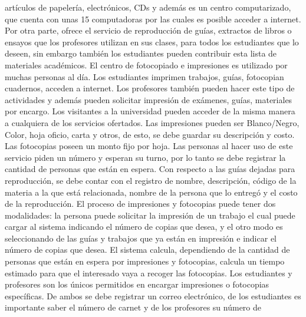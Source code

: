 \message{ !name(InformeFase2.tex)}\documentclass[12pt,a4paper,spanish]{article}
\begin{document}
art\'iculos de papeler\'ia, electr\'onicos, CDs y adem\'as es un
centro computarizado, que cuenta con unas 15 computadoras por las
cuales es posible acceder a internet. Por otra parte, ofrece el
servicio de reproducci\'on de gu\'ias, extractos de libros o ensayos
que los profesores utilizan en sus clases, para todos los estudiantes
que lo deseen, sin embargo tambi\'en los estudiantes pueden contribuir
esta lista de materiales acad\'emicos.
\newline
\newline
\indent El centro de fotocopiado e impresiones es utilizado por muchas
personas al d\'ia. Los estudiantes imprimen trabajos, gu\'ias,
fotocopian cuadernos, acceden a internet. Los profesores tambi\'en
pueden hacer este tipo de actividades y adem\'as pueden solicitar
impresi\'on de ex\'amenes, gu\'ias, materiales por encargo. Los
visitantes a la universidad pueden acceder de la misma manera a
cualquiera de los servicios ofertados.
\newline
\newline
\indent Las impresiones pueden ser Blanco/Negro, Color, hoja oficio,
carta y otros, de esto, se debe guardar su descripci\'on y costo. Las fotocopias
poseen un monto fijo por hoja. Las personas al hacer uso de este
servicio piden un n\'umero y esperan su turno, por lo tanto se debe
registrar la cantidad de personas que est\'an en espera. 
\newline
\newline
\indent Con respecto a las gu\'ias dejadas para reproducci\'on, se debe contar
con el registro de nombre, descripci\'on, c\'odigo de la materia a la que est\'a
relacionada, nombre de la persona que lo entreg\'o y el costo de la
reproducci\'on. El proceso de impresiones y fotocopias puede tener dos
modalidades: la persona puede solicitar la impresi\'on de un trabajo
el cual puede cargar al sistema indicando el n\'umero de copias que
desea, y el otro modo es seleccionando de las gu\'ias y trabajos que
ya est\'an en impresi\'on e indicar el n\'umero de copias que
desea. El sistema calcula, dependiendo de la cantidad de personas que
est\'an en espera por impresiones y fotocopias, calcula un tiempo
estimado para que el interesado vaya a recoger las fotocopias.
\newline
\newline
\indent Los estudiantes y profesores son los \'unicos permitidos en
encargar impresiones o fotocopias espec\'ificas. De ambos se debe
registrar un correo electr\'onico, de los estudiantes es importante
saber el n\'umero de carnet y de los profesores su n\'umero de 
\end{document}

